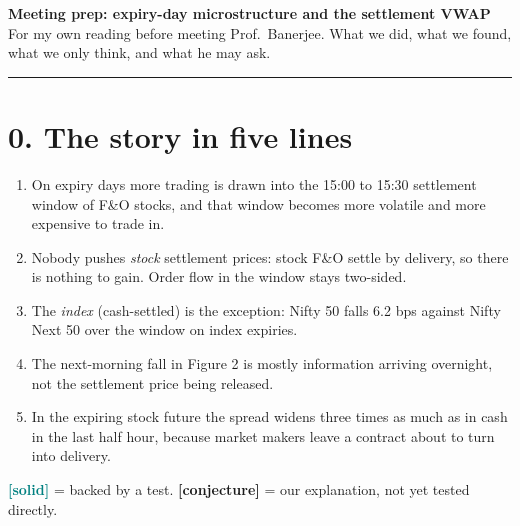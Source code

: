 \documentclass[11pt]{article}
\newcommand{\solid}{\textcolor{teal}{\textbf{[solid]}}}
\newcommand{\guess}{\textcolor{orange!80!black}{\textbf{[conjecture]}}}
\begin{document}
{\Large\textbf{Meeting prep: expiry-day microstructure and the settlement VWAP}}\\
For my own reading before meeting Prof.\ Banerjee. What we did, what we found, what we only
think, and what he may ask.

\hrule
\vspace{0.8em}

\section*{0. The story in five lines}
\begin{enumerate}
  \item On expiry days more trading is drawn into the 15:00 to 15:30 settlement window of F\&O
  stocks, and that window becomes more volatile and more expensive to trade in.
  \item Nobody pushes \emph{stock} settlement prices: stock F\&O settle by delivery, so there is
  nothing to gain. Order flow in the window stays two-sided.
  \item The \emph{index} (cash-settled) is the exception: Nifty 50 falls 6.2 bps against Nifty
  Next 50 over the window on index expiries.
  \item The next-morning fall in Figure 2 is mostly information arriving overnight, not the
  settlement price being released.
  \item In the expiring stock future the spread widens three times as much as in cash in the
  last half hour, because market makers leave a contract about to turn into delivery.
\end{enumerate}

\solid{} = backed by a test. \guess{} = our explanation, not yet tested directly.
\end{document}
